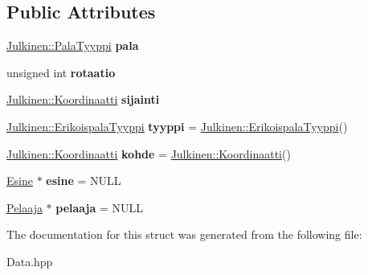 \subsection*{Public Attributes}
\begin{DoxyCompactItemize}
\item 
\hypertarget{struct_pala_a800e05c778f3840d5b6cab3dc87f04af}{}\hyperlink{namespace_julkinen_a272c70e0503191a485c8a9cd4281e6f5}{Julkinen\+::\+Pala\+Tyyppi} {\bfseries pala}\label{struct_pala_a800e05c778f3840d5b6cab3dc87f04af}

\item 
\hypertarget{struct_pala_a0a0d1ef610c373bbd8f898cde6538a23}{}unsigned int {\bfseries rotaatio}\label{struct_pala_a0a0d1ef610c373bbd8f898cde6538a23}

\item 
\hypertarget{struct_pala_aa4ae7ca61e68d684389625b4e34ffa6b}{}\hyperlink{class_julkinen_1_1_koordinaatti}{Julkinen\+::\+Koordinaatti} {\bfseries sijainti}\label{struct_pala_aa4ae7ca61e68d684389625b4e34ffa6b}

\item 
\hypertarget{struct_pala_a48ddab2b6bdc1c541289d296bc8db7af}{}\hyperlink{namespace_julkinen_afc26052e09d0b2214f749492cc5fff19}{Julkinen\+::\+Erikoispala\+Tyyppi} {\bfseries tyyppi} = \hyperlink{namespace_julkinen_afc26052e09d0b2214f749492cc5fff19}{Julkinen\+::\+Erikoispala\+Tyyppi}()\label{struct_pala_a48ddab2b6bdc1c541289d296bc8db7af}

\item 
\hypertarget{struct_pala_acab51bd466aa1ff640683094d1eb0d20}{}\hyperlink{class_julkinen_1_1_koordinaatti}{Julkinen\+::\+Koordinaatti} {\bfseries kohde} = \hyperlink{class_julkinen_1_1_koordinaatti}{Julkinen\+::\+Koordinaatti}()\label{struct_pala_acab51bd466aa1ff640683094d1eb0d20}

\item 
\hypertarget{struct_pala_a35fceec264ac79f3ddf3c12a4e3cde1f}{}\hyperlink{struct_esine}{Esine} $\ast$ {\bfseries esine} = N\+U\+L\+L\label{struct_pala_a35fceec264ac79f3ddf3c12a4e3cde1f}

\item 
\hypertarget{struct_pala_a9721ecfb8e78b412d5a6e0a72109e0e3}{}\hyperlink{struct_pelaaja}{Pelaaja} $\ast$ {\bfseries pelaaja} = N\+U\+L\+L\label{struct_pala_a9721ecfb8e78b412d5a6e0a72109e0e3}

\end{DoxyCompactItemize}


The documentation for this struct was generated from the following file\+:\begin{DoxyCompactItemize}
\item 
Data.\+hpp\end{DoxyCompactItemize}
